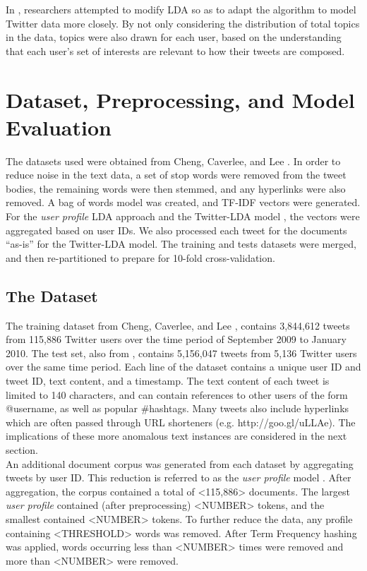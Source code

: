 \documentclass{acm_proc_article-sp}
\begin{document}
\hspace*{5mm}In \cite{zhao2011comparing}, researchers attempted to modify LDA so as to adapt the algorithm to model Twitter data more closely. By not only considering the distribution of total topics in the data, topics were also drawn for each user, based on the understanding that each user's set of interests are relevant to how their tweets are composed.

\section{Dataset, Preprocessing, and Model Evaluation}
\hspace*{5mm}The datasets used were obtained from Cheng, Caverlee, and Lee \cite{cheng2010content}. In order to reduce noise in the text data, a set of stop words were removed from the tweet bodies, the remaining words were then stemmed, and any hyperlinks were also removed. A bag of words model was created, and TF-IDF vectors were generated. For the \textit{user profile} LDA approach \cite{hong2010empirical} and the Twitter-LDA model \cite{zhao2011comparing}, the vectors were aggregated based on user IDs. We also processed each tweet for the documents ``as-is'' for the Twitter-LDA model. The training and tests datasets were merged, and then re-partitioned to prepare for 10-fold cross-validation.

\subsection{The Dataset}
\hspace*{5mm}The training dataset from Cheng, Caverlee, and Lee \cite{cheng2010content}, contains 3,844,612 tweets from 115,886 Twitter users over the time period of September 2009 to January 2010. The test set, also from \cite{cheng2010content}, contains 5,156,047 tweets from 5,136 Twitter users over the same time period. Each line of the dataset contains a unique user ID and tweet ID, text content, and a timestamp. The text content of each tweet is limited to 140 characters, and can contain references to other users of the form @username, as well as popular \#hashtags. Many tweets also include hyperlinks which are often passed through URL shorteners (e.g. http://goo.gl/uLLAe). The implications of these more anomalous text instances are considered in the next section.\\
\hspace*{5mm}An additional document corpus was generated from each dataset by aggregating tweets by user ID. This reduction is referred to as the \textit{user profile} model \cite{hong2010empirical}. After aggregation, the corpus contained a total of <115,886> documents. The largest \textit{user profile} contained (after preprocessing) <NUMBER> tokens, and the smallest contained <NUMBER> tokens. To further reduce the data, any profile containing <THRESHOLD> words was removed. After Term Frequency hashing was applied, words occurring less than <NUMBER> times were removed and more than <NUMBER> were removed\cite{cheng2010content}.
 
\end{document}
